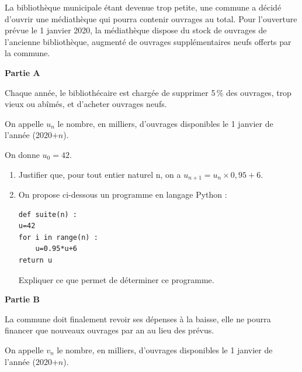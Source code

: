 \medskip

La bibliothèque municipale étant devenue trop petite, une commune a décidé d'ouvrir une médiathèque qui pourra contenir  ouvrages au total. Pour l'ouverture prévue le 1 janvier 2020, la médiathèque dispose du stock de  ouvrages de l'ancienne bibliothèque, augmenté de  ouvrages supplémentaires neufs offerts par la commune.

\medskip

\textbf{Partie A}

\medskip

Chaque année, le bibliothécaire est chargée de supprimer 5\,\% des ouvrages, trop vieux ou abîmés, et d'acheter  ouvrages neufs.

On appelle $u_n$ le nombre, en milliers, d'ouvrages disponibles le 1 janvier de l'année (2020+$n$).

On donne $u_0 = 42$.

\medskip
 
\begin{enumerate}
\item  Justifier que, pour tout entier naturel n, on a $u_{n+1} = u_n\times  0,95+6$.
\item On propose ci-dessous un programme en langage Python :
\begin{lstlisting}[style=python]
def suite(n) :
u=42
for i in range(n) :
	u=0.95*u+6
return u
\end{lstlisting}

Expliquer ce que permet de déterminer ce programme.
\end{enumerate}

\medskip

\textbf{Partie B}

\medskip

La commune doit finalement revoir ses dépenses à la baisse, elle ne pourra financer que  nouveaux ouvrages par an au lieu des  prévus.

On appelle $v_n$ le nombre, en milliers, d'ouvrages disponibles le 1 janvier de l'année (2020+$n$).

\medskip

